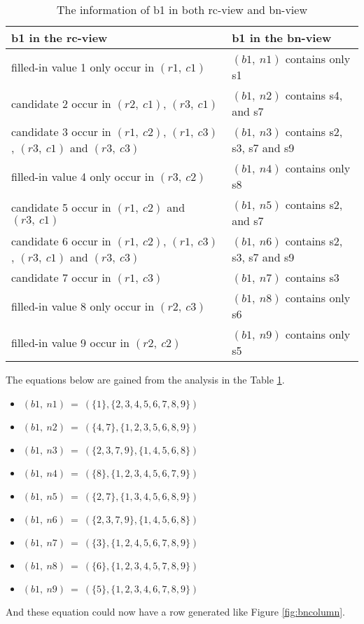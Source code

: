 \documentclass[11pt]{report}
\newcommand{\set}[1]{\{ #1 \}}
\begin{document}
\begin{table}
\begin{center}
  \begin{tabular}{|p{7cm}|p{7cm}|}
    \hline
    \textbf{b1 in the rc-view} & \textbf{b1 in the bn-view} \\ \hline
    filled-in value 1 only occur in $(r1,\ c1)$ & $(b1,\ n1)$ contains only s1\\ \hline
    candidate 2 occur in $(r2,\ c1)$, $(r3,\ c1)$ & $(b1,\ n2)$ contains s4, and s7 \\ \hline
    candidate 3 occur in $(r1,\ c2)$,  $(r1,\ c3)$, $(r3,\ c1)$ and $(r3,\ c3)$ & $(b1,\ n3)$ contains s2, s3, s7 and s9 \\ \hline
    filled-in value 4 only occur in $(r3,\ c2)$ & $(b1,\ n4)$ contains only s8 \\ \hline
    candidate 5 occur in $(r1,\ c2)$ and $(r3,\ c1)$ & $(b1,\ n5)$ contains s2, and s7 \\ \hline
    candidate 6 occur in $(r1,\ c2)$,  $(r1,\ c3)$, $(r3,\ c1)$ and $(r3,\ c3)$ & $(b1,\ n6)$ contains s2, s3, s7 and s9 \\ \hline
    candidate 7 occur in $(r1,\ c3)$& $(b1,\ n7)$ contains s3\\ \hline
    filled-in value 8 only occur in $(r2,\ c3)$ & $(b1,\ n8)$ contains only s6 \\ \hline
    filled-in value 9 occur in $(r2,\ c2)$ & $(b1,\ n9)$ contains only s5 \\ \hline
  \end{tabular}
\caption{The information of b1 in both rc-view and bn-view}
\label{tab:rcandbn}
\end{center}
\end{table}

The equations below are gained from the analysis in the Table \ref{tab:rcandbn}. 
\begin{itemize}
\item $(b1,\ n1)\ =\ (\set{1}, \set{2, 3, 4, 5, 6, 7, 8, 9})$
\item $(b1,\ n2)\ =\ (\set{4, 7}, \set{1, 2, 3, 5, 6, 8, 9})$
\item $(b1,\ n3)\ =\ (\set{2, 3, 7, 9}, \set{1, 4, 5, 6, 8})$
\item $(b1,\ n4)\ =\ (\set{8}, \set{1, 2, 3, 4, 5, 6, 7, 9})$
\item $(b1,\ n5)\ =\ (\set{2, 7}, \set{1, 3, 4, 5, 6, 8, 9})$
\item $(b1,\ n6)\ =\ (\set{2, 3, 7, 9}, \set{1, 4, 5, 6, 8})$
\item $(b1,\ n7)\ =\ (\set{3}, \set{1, 2, 4, 5, 6, 7, 8, 9})$
\item $(b1,\ n8)\ =\ (\set{6}, \set{1, 2, 3, 4, 5, 7, 8, 9})$
\item $(b1,\ n9)\ =\ (\set{5}, \set{1, 2, 3, 4, 6, 7, 8, 9})$
\end{itemize}
And these equation could now have a row generated like Figure \ref{fig:bncolumn}.
\end{document}
